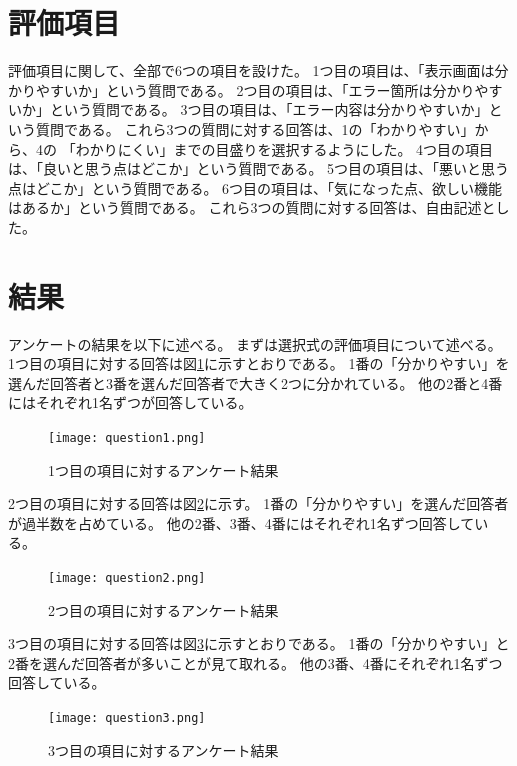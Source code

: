 \documentclass{csspaper}
\begin{document}
      \section{評価項目}
      評価項目に関して、全部で6つの項目を設けた。
      1つ目の項目は、「表示画面は分かりやすいか」という質問である。
      2つ目の項目は、「エラー箇所は分かりやすいか」という質問である。
      3つ目の項目は、「エラー内容は分かりやすいか」という質問である。
      これら3つの質問に対する回答は、1の「わかりやすい」から、4の
      「わかりにくい」までの目盛りを選択するようにした。
      4つ目の項目は、「良いと思う点はどこか」という質問である。
      5つ目の項目は、「悪いと思う点はどこか」という質問である。
      6つ目の項目は、「気になった点、欲しい機能はあるか」という質問である。
      これら3つの質問に対する回答は、自由記述とした。

      \section{結果}

      アンケートの結果を以下に述べる。
      まずは選択式の評価項目について述べる。
      1つ目の項目に対する回答は図\ref{fig:que1}に示すとおりである。
      1番の「分かりやすい」を選んだ回答者と3番を選んだ回答者で大きく2つに分かれている。
      他の2番と4番にはそれぞれ1名ずつが回答している。

      \begin{figure}[htbp]
         \centering
         \texttt{[image: question1.png]}
         \caption{1つ目の項目に対するアンケート結果}
         \label{fig:que1}
      \end{figure}

      2つ目の項目に対する回答は図\ref{fig:que2}に示す。
      1番の「分かりやすい」を選んだ回答者が過半数を占めている。
      他の2番、3番、4番にはそれぞれ1名ずつ回答している。

      \begin{figure}[htbp]
         \centering
         \texttt{[image: question2.png]}
         \caption{2つ目の項目に対するアンケート結果}
         \label{fig:que2}
      \end{figure}

      3つ目の項目に対する回答は図\ref{fig:que3}に示すとおりである。
      1番の「分かりやすい」と2番を選んだ回答者が多いことが見て取れる。
      他の3番、4番にそれぞれ1名ずつ回答している。

      \begin{figure}[htbp]
         \centering
         \texttt{[image: question3.png]}
         \caption{3つ目の項目に対するアンケート結果}
         \label{fig:que3}
      \end{figure}
\end{document}
